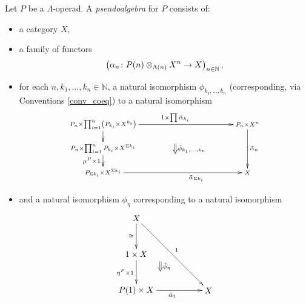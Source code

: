 \begin{Defi}\label{def:ps-alg-lop}
Let $P$ be a $\Lambda$-operad. A \textit{pseudoalgebra} for $P$ consists of: 
    \begin{itemize}
        \item a category $X$,
        \item a family of functors
            \[
                \left(\alpha_n \colon P(n) \otimes_{\Lambda(n)} X^{n} \rightarrow X \right)_{n \in \mathbb{N}},
            \]
        \item for each $n, k_1, \ldots, k_n \in \mathbb{N}$, a natural isomorphism $\phi_{k_1, \ldots, k_n}$ (corresponding, via Conventions \ref{conv_coeq}) to a natural isomorphism
            \[
                \xy
                    (0,0)*+{\scriptstyle P_n \times \prod_{i=1}^n \left(P_{k_i} \times X^{k_i}\right)}="00";
                    (0,-10)*+{\scriptstyle P_n \times \prod_{i=1}^n P_{k_i} \times X^{\Sigma k_i}}="01";
                    (0,-20)*+{\scriptstyle P_{\Sigma k_i} \times X^{\Sigma k_i}}="02";
                    (60,-20)*+{\scriptstyle X}="12";
                    (60,0)*+{\scriptstyle P_n \times X^n}="11";
                    {\ar_{} "00" ; "01"};
                    {\ar^{1 \times \prod \tilde{\alpha}_{k_i}} "00" ; "11"};
                    {\ar^{\tilde{\alpha}_n} "11" ; "12"};
                    {\ar_{\mu^P \times 1} "01" ; "02"};
                    {\ar_>>>>>>>>>>>>>>>>>>>{\tilde{\alpha}_{\Sigma k_i}} "02" ; "12"};
                    {\ar@{=>}^{\tilde{\phi}_{k_1, \ldots, k_n}} (30,-8) ; (30,-12)};
                \endxy
            \]

               \item and a natural isomorphism $\phi_{\eta}$ corresponding to a natural isomorphism
            \[
                \xy
                    (0,0)*+{X}="00";
                    (0,-15)*+{1 \times X}="x10";
                    (0,-30)*+{P(1) \times X}="10";
                    (30,-30)*+{X}="11";
                    {\ar_{\eta^P \times 1} "x10" ; "10"};
                    {\ar_{\tilde{\alpha}_1} "10" ; "11"};
                    {\ar^{1} "00" ; "11"};
                    {\ar_{\cong} "00" ; "x10"};
                    {\ar@{=>}^{\tilde{\phi}_\eta} (10,-18) ; (10,-22)};
                \endxy
            \]


\end{itemize}
\end{Defi}
